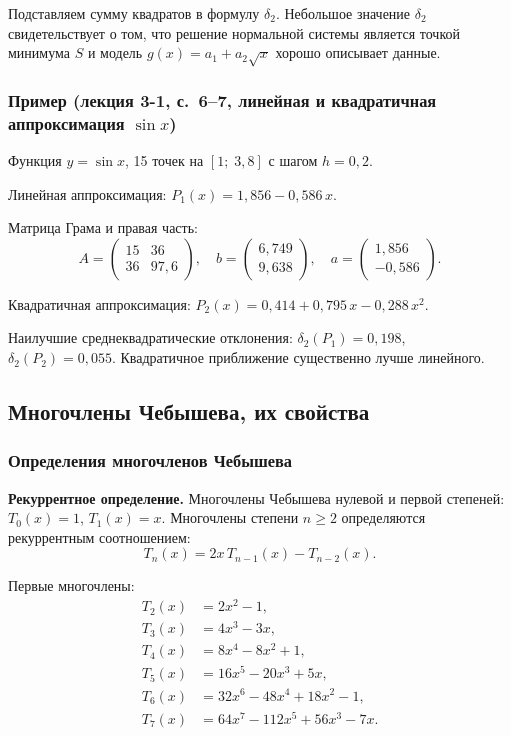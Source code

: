 Подставляем сумму квадратов в формулу $\delta_2$. Небольшое значение $\delta_2$ свидетельствует о том, что решение нормальной системы является точкой минимума $S$ и модель $g(x) = a_1 + a_2\sqrt{x}$ хорошо описывает данные.


\subsubsection*{Пример (лекция 3-1, с.~6--7, линейная и квадратичная аппроксимация $\sin x$)}

Функция $y = \sin x$, 15 точек на $[1;\; 3{,}8]$ с шагом $h = 0{,}2$.

Линейная аппроксимация: $P_1(x) = 1{,}856 - 0{,}586\,x$.

Матрица Грама и правая часть:
\[
    A = \begin{pmatrix} 15 & 36 \\ 36 & 97{,}6 \end{pmatrix}, \quad
    b = \begin{pmatrix} 6{,}749 \\ 9{,}638 \end{pmatrix}, \quad
    a = \begin{pmatrix} 1{,}856 \\ -0{,}586 \end{pmatrix}.
\]

Квадратичная аппроксимация: $P_2(x) = 0{,}414 + 0{,}795\,x - 0{,}288\,x^2$.

Наилучшие среднеквадратические отклонения: $\delta_2(P_1) = 0{,}198$, $\delta_2(P_2) = 0{,}055$. Квадратичное приближение существенно лучше линейного.

\subsection{Многочлены Чебышева, их свойства}

\subsubsection*{Определения многочленов Чебышева}

\textbf{Рекуррентное определение.} Многочлены Чебышева нулевой и первой степеней: $T_0(x) = 1$, $T_1(x) = x$. Многочлены степени $n \geq 2$ определяются рекуррентным соотношением:
\[
    T_n(x) = 2x\,T_{n-1}(x) - T_{n-2}(x).
\]

Первые многочлены:
\begin{align*}
    T_2(x) &= 2x^2 - 1, \\
    T_3(x) &= 4x^3 - 3x, \\
    T_4(x) &= 8x^4 - 8x^2 + 1, \\
    T_5(x) &= 16x^5 - 20x^3 + 5x, \\
    T_6(x) &= 32x^6 - 48x^4 + 18x^2 - 1, \\
    T_7(x) &= 64x^7 - 112x^5 + 56x^3 - 7x.
\end{align*}

